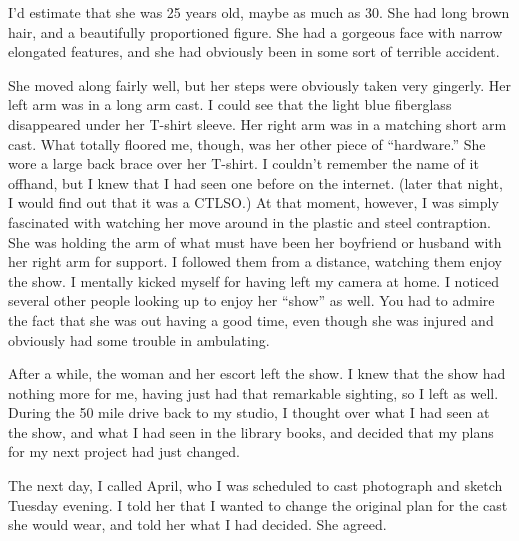 I'd estimate that she was 25 years old, maybe as much as 30. She had long brown hair, and a
beautifully proportioned figure. She had a gorgeous face with narrow elongated features, and she
had obviously been in some sort of terrible accident.

She moved along fairly well, but her steps were obviously taken very gingerly. Her left arm was
in a long arm cast. I could see that the light blue fiberglass disappeared under her T-shirt
sleeve. Her right arm was in a matching short arm cast. What totally floored me, though, was her
other piece of ``hardware.'' She wore a large back brace over her T-shirt. I couldn't remember
the name of it offhand, but I knew that I had seen one before on the internet. (later that
night, I would find out that it was a CTLSO.) At that moment, however, I was simply fascinated
with watching her move around in the plastic and steel contraption. She was holding the arm of
what must have been her boyfriend or husband with her right arm for support. I followed them
from a distance, watching them enjoy the show. I mentally kicked myself for having left my
camera at home. I noticed several other people looking up to enjoy her ``show'' as well. You had
to admire the fact that she was out having a good time, even though she was injured and
obviously had some trouble in ambulating.

After a while, the woman and her escort left the show. I knew that the show had nothing more for
me, having just had that remarkable sighting, so I left as well. During the 50 mile drive back
to my studio, I thought over what I had seen at the show, and what I had seen in the library
books, and decided that my plans for my next project had just changed.

The next day, I called April, who I was scheduled to cast photograph and sketch Tuesday evening.
I told her that I wanted to change the original plan for the cast she would wear, and told her
what I had decided. She agreed.
